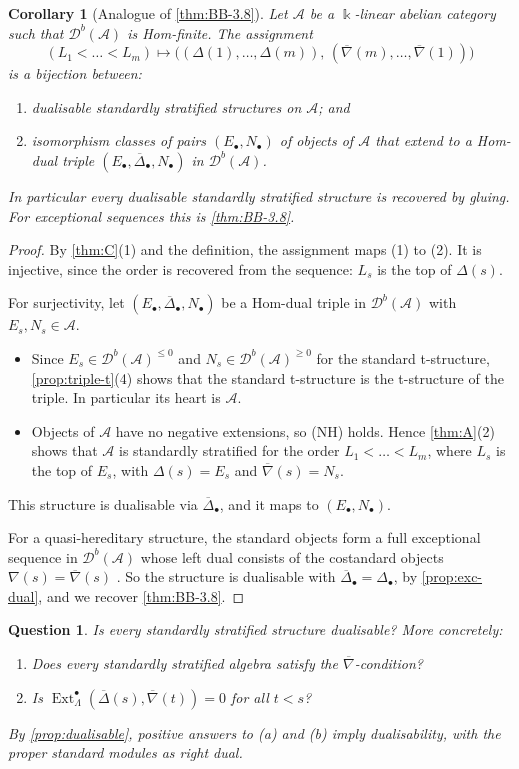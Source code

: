 \documentclass[11pt,reqno]{amsart}
\theoremstyle{plain}
\newtheorem{corollary}[theorem]{Corollary}
\newtheorem{question}[theorem]{Question}
\theoremstyle{definition}
\theoremstyle{remark}
\newcommand{\kk}{\Bbbk}
\DeclareMathOperator{\Ext}{Ext}
\newcommand{\Db}{\mathcal{D}^b}
\newcommand{\nablabar}{\overline{\nabla}}
\newcommand{\Deltabar}{\overline{\Delta}}
\newcommand{\cA}{\mathcal{A}}
\begin{document}
\begin{corollary}[Analogue of {\cref{thm:BB-3.8}}]\label{cor:BB38}
Let $\cA$ be a $\kk$-linear abelian category such that $\Db(\cA)$ is Hom-finite. The assignment
\[(L_1<\dots<L_m)\longmapsto\big((\Delta(1),\dots,\Delta(m)),\,(\nablabar(m),\dots,\nablabar(1))\big)\]
is a bijection between:
\begin{enumerate}
\item dualisable standardly stratified structures on $\cA$; and
\item isomorphism classes of pairs $(E_\bullet,N_\bullet)$ of objects of $\cA$ that extend to a Hom-dual triple $(E_\bullet,\Deltabar_\bullet,N_\bullet)$ in $\Db(\cA)$.
\end{enumerate}
In particular every dualisable standardly stratified structure is recovered by gluing. For exceptional sequences this is \cref{thm:BB-3.8}.
\end{corollary}

\begin{proof}
By \cref{thm:C}(1) and the definition, the assignment maps (1) to (2). It is injective, since the order is recovered from the sequence: $L_s$ is the top of $\Delta(s)$.

For surjectivity, let $(E_\bullet,\Deltabar_\bullet,N_\bullet)$ be a Hom-dual triple in $\Db(\cA)$ with $E_s,N_s\in\cA$.
\begin{itemize}
\item Since $E_s\in\Db(\cA)^{\le0}$ and $N_s\in\Db(\cA)^{\ge0}$ for the standard t-structure, \cref{prop:triple-t}(4) shows that the standard t-structure is the t-structure of the triple. In particular its heart is $\cA$.
\item Objects of $\cA$ have no negative extensions, so (NH) holds. Hence \cref{thm:A}(2) shows that $\cA$ is standardly stratified for the order $L_1<\dots<L_m$, where $L_s$ is the top of $E_s$, with $\Delta(s)=E_s$ and $\nablabar(s)=N_s$.
\end{itemize}
This structure is dualisable via $\Deltabar_\bullet$, and it maps to $(E_\bullet,N_\bullet)$.

For a quasi-hereditary structure, the standard objects form a full exceptional sequence in $\Db(\cA)$ whose left dual consists of the costandard objects $\nabla(s)=\nablabar(s)$ \cite[\S3]{BB26}. So the structure is dualisable with $\Deltabar_\bullet=\Delta_\bullet$, by \cref{prop:exc-dual}, and we recover \cref{thm:BB-3.8}.
\end{proof}

\begin{question}\label{q:HD4}
Is every standardly stratified structure dualisable? More concretely:
\begin{enumerate}
\item[(a)] Does every standardly stratified algebra satisfy the $\nablabar$-condition?
\item[(b)] Is $\Ext^\bullet_\Lambda(\Deltabar(s),\nablabar(t))=0$ for all $t<s$?
\end{enumerate}
By \cref{prop:dualisable}, positive answers to (a) and (b) imply dualisability, with the proper standard modules as right dual.
\end{question}
\end{document}
